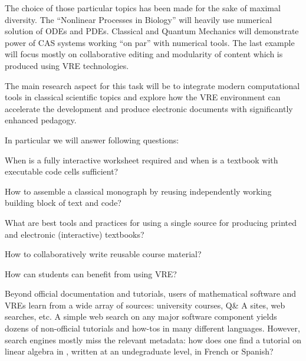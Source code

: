 \begin{workpackage}
\begin{tasklist}
\begin{task}[title=Demonstrator: Interactive books,
id=ibook,lead=US,PM=30]
The choice of those particular topics has been made for the sake of
maximal diversity. The ``Nonlinear Processes in Biology'' will heavily
use numerical solution of ODEs and PDEs.
Classical and Quantum Mechanics will demonstrate power of
CAS systems working ``on par'' with numerical tools. The last example
will focus mostly on collaborative editing and modularity of content
which is produced using VRE technologies.

The main research aspect for this task will be to integrate modern
computational tools in classical scientific topics and explore how
the VRE environment can accelerate the development and produce electronic
documents with significantly enhanced pedagogy.

In particular we will answer following questions:

\begin{compactitem}
\item When is a fully interactive worksheet required and when is
  a textbook with executable code cells sufficient?
\item How to assemble a classical monograph by reusing independently working
  building block of text and code?
\item What are best tools and practices for using a single source for
  producing printed and electronic (interactive) textbooks?
\item How to collaboratively write reusable course material?
\item How can students can benefit from using VRE?
\end{compactitem}


\end{task}

\begin{task}[title=Demonstrator: Computational mathematics resources indexing service,
id=index-librorum-salvificorum,lead=UV,PM=2,partners={UB}] Beyond official documentation and
  tutorials, users of mathematical software and VREs learn from a wide
  array of sources: university courses, Q\& A sites, web searches,
  etc.  A simple web search on any major software component yields
  dozens of non-official tutorials and how-tos in many different
  languages. However, search engines mostly miss the relevant
  metadata: how does one find a tutorial on linear algebra in \PariGP,
  written at an undegraduate level, in French or Spanish?


\end{task}
\end{tasklist}
\end{workpackage}
